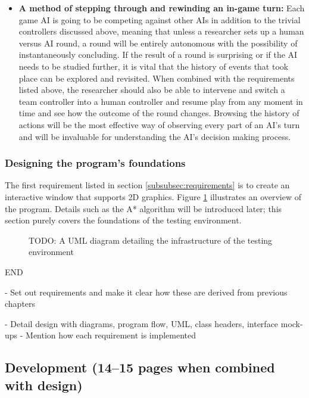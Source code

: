 \documentclass[11pt, a4paper]{article}
\begin{document}
\begin{itemize}
\item \textbf{A method of stepping through and rewinding an in-game turn:}
Each game AI is going to be competing against other AIs in addition to the trivial controllers discussed above, meaning that unless a researcher sets up a human versus AI round, a round will be entirely autonomous with the possibility of instantaneously concluding. If the result of a round is surprising or if the AI needs to be studied further, it is vital that the history of events that took place can be explored and revisited. When combined with the requirements listed above, the researcher should also be able to intervene and switch a team controller into a human controller and resume play from any moment in time and see how the outcome of the round changes. Browsing the history of actions will be the most effective way of observing every part of an AI's turn and will be invaluable for understanding the AI's decision making process.

\end{itemize}

\subsubsection{Designing the program's foundations}
The first requirement listed in section \ref{subsubsec:requirements} is to create an interactive window that supports 2D graphics. Figure \ref{fig:foundationsUML} illustrates an overview of the program. Details such as the A* algorithm will be introduced later; this section purely covers the foundations of the testing environment.

\begin{figure}[h]
  \centering
  
  \caption{TODO: A UML diagram detailing the infrastructure of the testing environment}
  \label{fig:foundationsUML}
\end{figure}

END

- Set out requirements and make it clear how these are derived from previous chapters

- Detail design with diagrams, program flow, UML, class headers, interface mock-ups
  - Mention how each requirement is implemented

\subsection {Development (14--15 pages when combined with design)}
\label{subsec:development}
\end{document}
